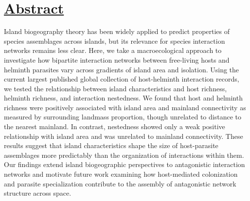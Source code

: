 \section*{\textbf{\underline{Abstract}}}
Island biogeography theory has been widely applied to predict properties of species assemblages across islands, but its relevance for species interaction networks remains less clear. Here, we take a macroecological approach to investigate how bipartite interaction networks between free-living hosts and helminth parasites vary across gradients of island area and isolation. Using the current largest published global collection of host-helminth interaction records, we tested the relationship between island characteristics and host richness, helminth richness, and interaction nestedness. We found that host and helminth richness were positively associated with island area and mainland connectivity as measured by surrounding landmass proportion, though unrelated to distance to the nearest mainland. In contrast, nestedness showed only a weak positive relationship with island area and was unrelated to mainland connectivity. These results suggest that island characteristics shape the size of host-parasite assemblages more predictably than the organization of interactions within them. Our findings extend island biogeographic perspectives to antagonistic interaction networks and motivate future work examining how host-mediated colonization and parasite specialization contribute to the assembly of antagonistic network structure across space.



\clearpage

